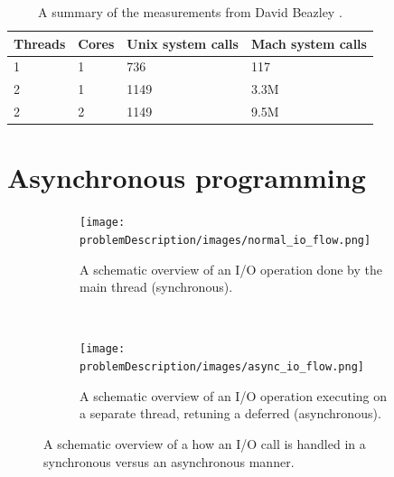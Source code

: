 \begin{table}[]
	\centering
	\begin{tabular}{|l|l|l|l|}
		\hline
	\textbf{Threads}	& \textbf{Cores} & \textbf{Unix system calls} & \textbf{Mach system calls} \\ \hline
	1	& 1 & 736 & 117 \\ \hline
	2	& 1 & 1149 & 3.3M \\ \hline
	2	& 2 & 1149 & 9.5M \\ \hline
	\end{tabular}
	\caption{A summary of the measurements from David Beazley \cite{beazley2009inside}.}
	\label{tbl:system_calls_thread_switching}
\end{table}



\section{Asynchronous programming}

\begin{figure}[!h]
	\centering
	\begin{subfigure}[b]{\textwidth}
		\texttt{[image: problemDescription/images/normal\_io\_flow.png]}
		\caption{A schematic overview of an I/O operation done by the main thread (synchronous).}
		\label{fig:normal_io_flow}
	\end{subfigure}
	~ %
	\begin{subfigure}[b]{\textwidth}
		\texttt{[image: problemDescription/images/async\_io\_flow.png]}
		\caption{A schematic overview of an I/O operation executing on a separate thread, retuning a deferred (asynchronous).}
		\label{fig:async_io_flow}
	\end{subfigure}
	\caption{A schematic overview of a how an I/O call is handled in a synchronous versus an asynchronous manner.}
\end{figure}


